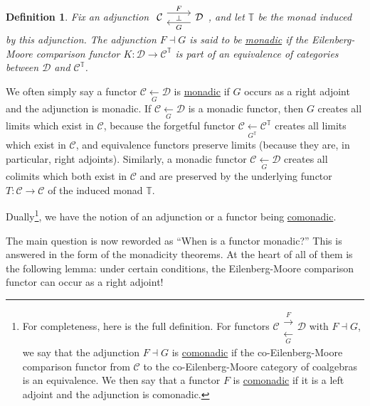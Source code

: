 \documentclass[a4paper,11pt]{article}
\theoremstyle{break_italics}
\newtheorem*{definition*}{Definition}
\theoremstyle{break_upright}
\theoremstyle{remark}
\newcommand{\C}{\mathcal{C}}
\newcommand{\D}{\mathcal{D}}
\begin{document}
\begin{definition*}
Fix an adjunction $\begin{tikzcd}
	\C & \D
	\arrow["\bot"{description}, draw=none, from=1-1, to=1-2]
	\arrow["F", shift left=2, from=1-1, to=1-2]
	\arrow["G", shift left=2, from=1-2, to=1-1]
\end{tikzcd}$, and let $\mathbb T$ be the monad induced by this adjunction. The adjunction $F \dashv G$ is said to be \uline{monadic} if the Eilenberg-Moore comparison functor $K \colon \D \to \C^{\mathbb T}$ is part of an equivalence of categories between $\D$ and $\C^{\mathbb T}$.
\end{definition*}

We often simply say a functor $\C \xleftarrow[G]{} \D$ is \uline{monadic} if $G$ occurs as a right adjoint and the adjunction is monadic. If $\C \xleftarrow[G]{} \D$ is a monadic functor, then $G$ creates all limits which exist in $\C$, because the forgetful functor $\C \xleftarrow[G^{\mathbb T}]{} \C^{\mathbb T}$ creates all limits which exist in $\C$, and equivalence functors preserve limits (because they are, in particular, right adjoints). Similarly, a monadic functor $\C \xleftarrow[G]{} \D$ creates all colimits which both exist in $\C$ and are preserved by the underlying functor $T \colon \C \to \C$ of the induced monad $\mathbb T$.

Dually\footnote{For completeness, here is the full definition. For functors $\C \substack{\xrightarrow{F} \\ \xleftarrow[G]{}} \D$ with $F \dashv G$, we say that the adjunction $F \dashv G$ is \uline{comonadic} if the co-Eilenberg-Moore comparison functor from $\C$ to the co-Eilenberg-Moore category of coalgebras is an equivalence. We then say that a functor $F$ is \uline{comonadic} if it is a left adjoint and the adjunction is comonadic.}, we have the notion of an adjunction or a functor being \uline{comonadic}.

The main question is now reworded as ``When is a functor monadic?'' This is answered in the form of the monadicity theorems. At the heart of all of them is the following lemma: under certain conditions, the Eilenberg-Moore comparison functor can occur as a right adjoint!
\end{document}
